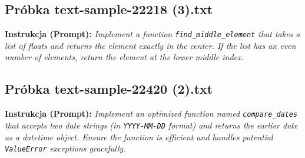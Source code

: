 \subsection{Próbka text-sample-22218 (3).txt}
\label{sec:lst:text-sample-22218-3}
\textbf{Instrukcja (Prompt):} \textit{Implement a function \texttt{find\_middle\_element} that takes a list of floats and returns the element exactly in the center. If the list has an even number of elements, return the element at the lower middle index.}




\subsection{Próbka text-sample-22420 (2).txt}
\label{sec:lst:text-sample-22420-2}
\textbf{Instrukcja (Prompt):} \textit{Implement an optimized function named \texttt{compare\_dates} that accepts two date strings (in \texttt{YYYY-MM-DD} format) and returns the earlier date as a datetime object. Ensure the function is efficient and handles potential \texttt{ValueError} exceptions gracefully.}

